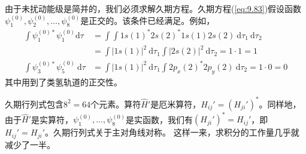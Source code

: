     由于未扰动能级是简并的，我们必须求解久期方程。久期方程(\ref{eq:9.83})假设函数$\psi_1^{\left(0\right)}, \psi_2^{\left(0\right)}, \ldots, \psi_8^{\left(0\right)}$是正交的。该条件已经满足。例如，
    \begin{equation*}
        \begin{aligned}
            \int \psi_1^{\left(0\right)*}\psi_1^{\left(0\right)}\mathrm{d}\tau &= \int\int 1s\left(1\right)^*2s\left(2\right)^*1s\left(1\right)2s\left(2\right)\:\mathrm{d}\tau_1\:\mathrm{d}\tau_2 \\
            &= \int \left|1s\left(1\right)\right|^2 \:\mathrm{d}\tau_1 \int \left|2s\left(2\right)\right|^2 \:\mathrm{d}\tau_2 = 1 \cdot 1 = 1 \\ 
            \int \psi_3^{\left(0\right)*}\psi_5^{\left(0\right)}\:\mathrm{d}\tau &= \int \left|1s\left(1\right)\right|^2 \:\mathrm{d}\tau_1 \int 2p_x\left(2\right)^*2p_y\left(2\right)\:\mathrm{d}\tau_2 = 1 \cdot 0 = 0
        \end{aligned}
    \end{equation*}
    其中用到了类氢轨道的正交性。

    久期行列式包含$8^2 = 64$个元素。算符$\hat{H}'$是厄米算符，$H_{ij}' = \left(H_{ji}'\right)^*$。同样地，由于$\hat{H}'$是实算符，$\psi_1^{\left(0\right)},\ldots, \psi_8^{\left(0\right)}$是实函数，我们有$\left(H_{ji}'\right)^* = H_{ij}'$，即$H_{ij}' = H_{ji}'$。久期行列式关于主对角线对称。 这样一来，求积分的工作量几乎就减少了一半。

